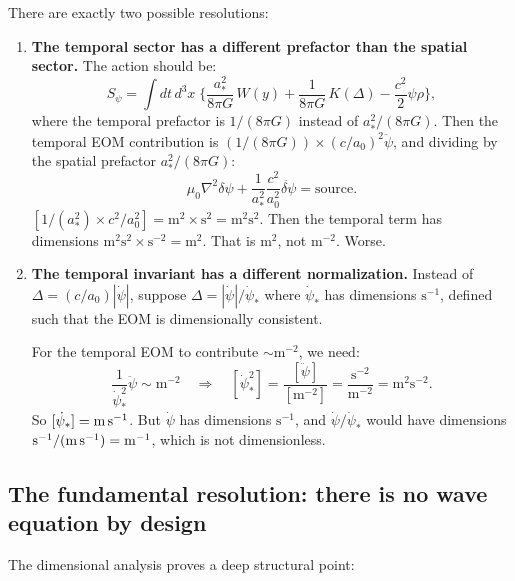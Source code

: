 \documentclass[11pt]{article}
\begin{document}
There are exactly two possible resolutions:

\begin{enumerate}
\item \textbf{The temporal sector has a different prefactor than the spatial sector.} The action should be:
\begin{equation}
S_\psi = \int dt\,d^3x\;\biggl\{
  \frac{a_*^2}{8\pi G}\,W(y)
  + \frac{1}{8\pi G}\,K(\Delta)
  - \frac{c^2}{2}\psi\rho
\biggr\},
\label{eq:resolution-1}
\end{equation}
where the temporal prefactor is $1/(8\pi G)$ instead of $a_*^2/(8\pi G)$. Then the temporal EOM contribution is $(1/(8\pi G)) \times (c/a_0)^2\ddot\psi$, and dividing by the spatial prefactor $a_*^2/(8\pi G)$:
\begin{equation}
\mu_0\nabla^2\delta\psi + \frac{1}{a_*^2}\frac{c^2}{a_0^2}\ddot{\delta\psi} = \text{source}.
\end{equation}
$[1/(a_*^2) \times c^2/a_0^2] = \text{m}^2 \times \text{s}^2 = \text{m}^2\text{s}^2$. Then the temporal term has dimensions $\text{m}^2\text{s}^2 \times \text{s}^{-2} = \text{m}^2$. That is $\text{m}^2$, not $\text{m}^{-2}$. Worse.

\item \textbf{The temporal invariant has a different normalization.} Instead of $\Delta = (c/a_0)|\dot\psi|$, suppose $\Delta = |\dot\psi|/\dot\psi_*$ where $\dot\psi_*$ has dimensions $\text{s}^{-1}$, defined such that the EOM is dimensionally consistent.

For the temporal EOM to contribute $\sim \text{m}^{-2}$, we need:
\begin{equation}
\frac{1}{\dot\psi_*^2}\ddot\psi \sim \text{m}^{-2} \quad \Rightarrow \quad
[\dot\psi_*^2] = \frac{[\ddot\psi]}{[\text{m}^{-2}]} = \frac{\text{s}^{-2}}{\text{m}^{-2}} = \text{m}^2\text{s}^{-2}.
\end{equation}
So $[\dot\psi_*] = \text{m\,s}^{-1}$. But $\dot\psi$ has dimensions $\text{s}^{-1}$, and $\dot\psi/\dot\psi_*$ would have dimensions $\text{s}^{-1}/(\text{m\,s}^{-1}) = \text{m}^{-1}$, which is not dimensionless.
\end{enumerate}

\subsection{The fundamental resolution: there is no wave equation by design}

The dimensional analysis proves a deep structural point:
\end{document}
